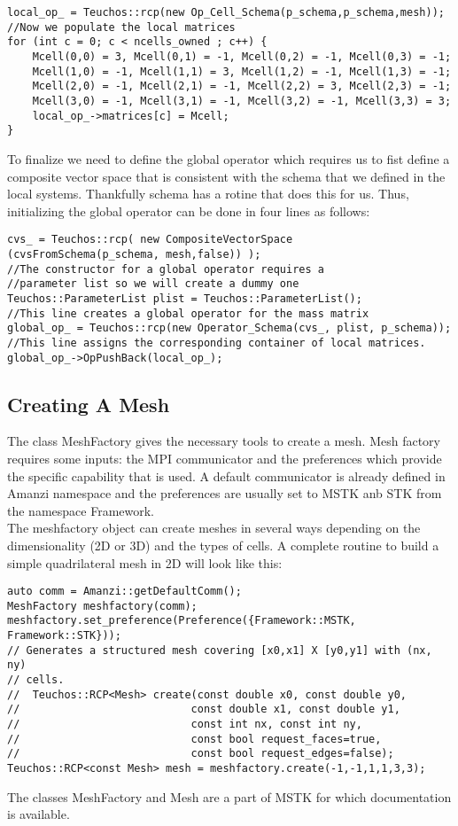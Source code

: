 %
\begin{lstlisting}
local_op_ = Teuchos::rcp(new Op_Cell_Schema(p_schema,p_schema,mesh));
//Now we populate the local matrices
for (int c = 0; c < ncells_owned ; c++) {
	Mcell(0,0) = 3, Mcell(0,1) = -1, Mcell(0,2) = -1, Mcell(0,3) = -1;
	Mcell(1,0) = -1, Mcell(1,1) = 3, Mcell(1,2) = -1, Mcell(1,3) = -1;
	Mcell(2,0) = -1, Mcell(2,1) = -1, Mcell(2,2) = 3, Mcell(2,3) = -1;
	Mcell(3,0) = -1, Mcell(3,1) = -1, Mcell(3,2) = -1, Mcell(3,3) = 3;
	local_op_->matrices[c] = Mcell;
}
\end{lstlisting}
%
To finalize we need to define the global operator which requires us to fist define a composite vector space that is consistent with the schema that we defined in the local systems. Thankfully schema has a rotine that does this for us. Thus, initializing the global operator can be done in four lines as follows:
\begin{lstlisting}
cvs_ = Teuchos::rcp( new CompositeVectorSpace 
(cvsFromSchema(p_schema, mesh,false)) );
//The constructor for a global operator requires a 
//parameter list so we will create a dummy one
Teuchos::ParameterList plist = Teuchos::ParameterList();
//This line creates a global operator for the mass matrix
global_op_ = Teuchos::rcp(new Operator_Schema(cvs_, plist, p_schema));
//This line assigns the corresponding container of local matrices.
global_op_->OpPushBack(local_op_);
\end{lstlisting}
%
\subsection{Creating A Mesh}\label{CreatingAMesh}
The class MeshFactory gives the necessary tools to create a mesh. Mesh factory requires some inputs: the MPI communicator and the preferences which provide the specific capability that is used. A default communicator is already defined in Amanzi namespace and the preferences are usually set to MSTK anb STK from the namespace Framework.\\
The meshfactory object can create meshes in several ways depending on the dimensionality (2D or 3D) and the types of cells. A complete routine to build a simple quadrilateral mesh in 2D will look like this: 
%
\begin{lstlisting}
auto comm = Amanzi::getDefaultComm();
MeshFactory meshfactory(comm);
meshfactory.set_preference(Preference({Framework::MSTK, Framework::STK}));
// Generates a structured mesh covering [x0,x1] X [y0,y1] with (nx, ny)
// cells.
//  Teuchos::RCP<Mesh> create(const double x0, const double y0,
//                           const double x1, const double y1,
//                           const int nx, const int ny,
//                           const bool request_faces=true,
//                           const bool request_edges=false);
Teuchos::RCP<const Mesh> mesh = meshfactory.create(-1,-1,1,1,3,3);
\end{lstlisting}
%
The classes MeshFactory and Mesh are a part of MSTK for which documentation is available. 
%
